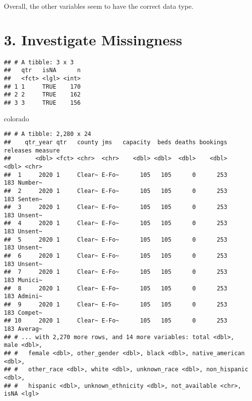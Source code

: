 \documentclass[
]{article}
\newenvironment{Shaded}{\begin{snugshade}}{\end{snugshade}}
\newcommand{\DataTypeTok}[1]{\textcolor[rgb]{0.13,0.29,0.53}{#1}}
\newcommand{\KeywordTok}[1]{\textcolor[rgb]{0.13,0.29,0.53}{\textbf{#1}}}
\newcommand{\NormalTok}[1]{#1}
\newcommand{\OperatorTok}[1]{\textcolor[rgb]{0.81,0.36,0.00}{\textbf{#1}}}
\newcommand{\OtherTok}[1]{\textcolor[rgb]{0.56,0.35,0.01}{#1}}
\newcommand{\StringTok}[1]{\textcolor[rgb]{0.31,0.60,0.02}{#1}}
\begin{document}
Overall, the other variables seem to have the correct data type.

\hypertarget{investigate-missingness}{%
\section{3. Investigate Missingness}\label{investigate-missingness}}

\begin{Shaded}
\end{Shaded}

\begin{verbatim}
## # A tibble: 3 x 3
##   qtr   isNA      n
##   <fct> <lgl> <int>
## 1 1     TRUE    170
## 2 2     TRUE    162
## 3 3     TRUE    156
\end{verbatim}

\begin{Shaded}
\begin{Highlighting}[]
\NormalTok{colorado}
\end{Highlighting}
\end{Shaded}

\begin{verbatim}
## # A tibble: 2,280 x 24
##    qtr_year qtr   county jms   capacity  beds deaths bookings releases measure
##       <dbl> <fct> <chr>  <chr>    <dbl> <dbl>  <dbl>    <dbl>    <dbl> <chr>  
##  1     2020 1     Clear~ E-Fo~      105   105      0      253      183 Number~
##  2     2020 1     Clear~ E-Fo~      105   105      0      253      183 Senten~
##  3     2020 1     Clear~ E-Fo~      105   105      0      253      183 Unsent~
##  4     2020 1     Clear~ E-Fo~      105   105      0      253      183 Unsent~
##  5     2020 1     Clear~ E-Fo~      105   105      0      253      183 Unsent~
##  6     2020 1     Clear~ E-Fo~      105   105      0      253      183 Unsent~
##  7     2020 1     Clear~ E-Fo~      105   105      0      253      183 Munici~
##  8     2020 1     Clear~ E-Fo~      105   105      0      253      183 Admini~
##  9     2020 1     Clear~ E-Fo~      105   105      0      253      183 Compet~
## 10     2020 1     Clear~ E-Fo~      105   105      0      253      183 Averag~
## # ... with 2,270 more rows, and 14 more variables: total <dbl>, male <dbl>,
## #   female <dbl>, other_gender <dbl>, black <dbl>, native_american <dbl>,
## #   other_race <dbl>, white <dbl>, unknown_race <dbl>, non_hispanic <dbl>,
## #   hispanic <dbl>, unknown_ethnicity <dbl>, not_available <chr>, isNA <lgl>
\end{verbatim}
\end{document}
